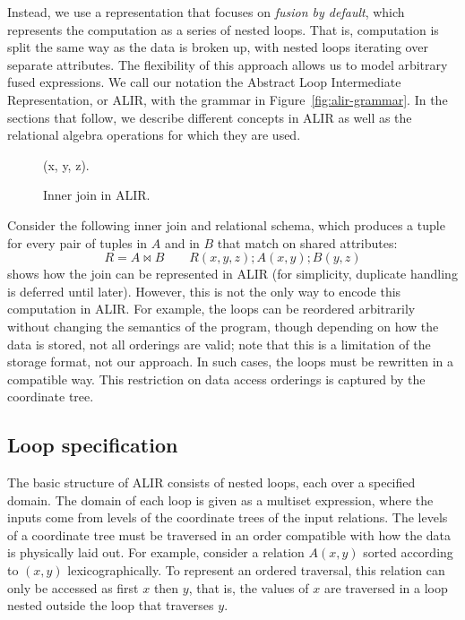 \documentclass[acmsmall,screen,nonacm]{acmart}\settopmatter{printfolios=true,printccs=false,printacmref=false}
\DeclareMathOperator*{\ijoin}{\Join}
\begin{document}
Instead, we use a representation that focuses on \emph{fusion by default}, which represents the
computation as a series of nested loops.
That is, computation is split the same way as the data is broken up, with nested loops iterating over separate attributes.
The flexibility of this approach allows us to model arbitrary fused expressions.
We call our notation the Abstract Loop Intermediate Representation, or ALIR, with the grammar in Figure~\ref{fig:alir-grammar}. In the sections that follow, we describe different concepts in ALIR as well as the relational algebra operations for which they are used.

\begin{wrapfigure}{r}{0.23\textwidth}
\vspace{-1.2em}
\begin{algorithmic}\footnotesize
                \State (x, y, z).
            \EndALIRFor
        \EndALIRFor
    \EndALIRFor
\end{algorithmic}
\vspace{-1em}
\caption{Inner join in ALIR.\label{fig:inner-join-alir}}
\end{wrapfigure}
Consider the following inner join and relational schema, which produces a tuple for every pair of tuples in $A$ and in $B$ that match on shared attributes: \[ R = A \ijoin B \quad\quad R(x, y, z); A(x, y); B(y, z) \]  shows how the join can be represented in ALIR (for simplicity, duplicate handling is deferred until later). However, this is not the only way to encode this computation in ALIR. For example, the loops can be reordered arbitrarily without changing the semantics of the program, though depending on how the data is stored, not all orderings are valid; note that this is a limitation of the storage format, not our approach. In such cases, the loops must be rewritten in a compatible way. This restriction on data access orderings is captured by the coordinate tree.

\subsection{Loop specification}
\label{subsec:loop-specification}
The basic structure of ALIR consists of nested loops, each over a
specified domain. The domain of each loop is given as a multiset
expression, where the inputs come from levels of
the coordinate trees of the input relations.
The levels of a coordinate tree must be traversed in an order
compatible with how the data is physically laid out. For example,
consider a relation $A(x, y)$ sorted according to $(x, y)$ lexicographically.
To represent an ordered traversal, this relation can only be accessed as first $x$ then $y$,
that is, the values of $x$ are traversed in a loop nested outside
the loop that traverses $y$.
\end{document}
